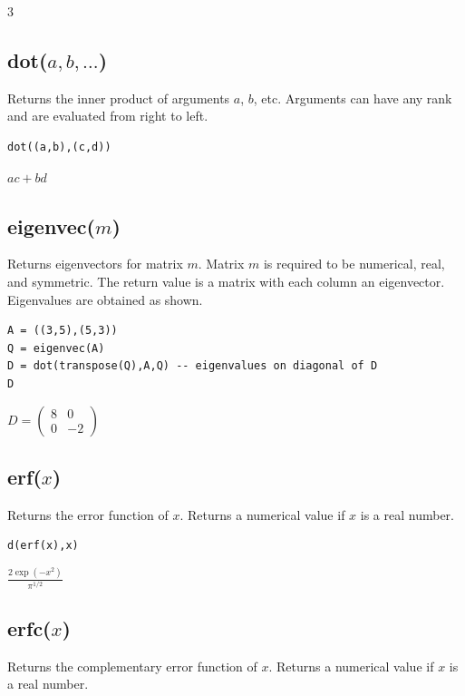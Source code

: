 \documentclass[12pt]{article}
\begin{document}
$3$

\subsection*{dot($a,b,\ldots$)}

Returns the inner product of arguments $a$, $b$, etc.
Arguments can have any rank and are evaluated from right to left.

{\color{blue}
\begin{verbatim}
dot((a,b),(c,d))
\end{verbatim}
}

$ac+bd$

\subsection*{eigenvec($m$)}

Returns eigenvectors for matrix $m$.
Matrix $m$ is required to be numerical, real, and symmetric.
The return value is a matrix with each column an eigenvector.
Eigenvalues are obtained as shown.

{\color{blue}
\begin{verbatim}
A = ((3,5),(5,3))
Q = eigenvec(A)
D = dot(transpose(Q),A,Q) -- eigenvalues on diagonal of D
D
\end{verbatim}
}

$\displaystyle
D=\begin{pmatrix}
8 & 0
\\[1ex]
0 & -2
\end{pmatrix}
$

\subsection*{erf($x$)}

Returns the error function of $x$.
Returns a numerical value if $x$ is a real number.

{\color{blue}
\begin{verbatim}
d(erf(x),x)
\end{verbatim}
}

$\displaystyle \frac{2\exp(-x^2)}{\pi^{1/2}}$

\subsection*{erfc($x$)}

Returns the complementary error function of $x$.
Returns a numerical value if $x$ is a real number.
\end{document}
